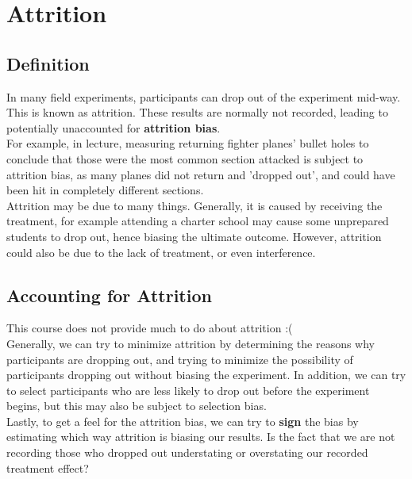 \documentclass{article}
\begin{document}
\section{Attrition}
\subsection{Definition}
In many field experiments, participants can drop out of the experiment mid-way.
This is known as attrition. 
These results are normally not recorded, leading to potentially unaccounted for \textbf{attrition bias}. 
\\
For example, in lecture, measuring returning fighter planes' bullet holes to conclude that those were the most common section attacked is subject to attrition bias, as many planes did not return and 'dropped out', and could have been hit in completely different sections.
\\
Attrition may be due to many things.
Generally, it is caused by receiving the treatment, for example attending a charter school may cause some unprepared students to drop out, hence biasing the ultimate outcome.
However, attrition could also be due to the lack of treatment, or even interference. 

\subsection{Accounting for Attrition}
This course does not provide much to do about attrition :(
\\
Generally, we can try to minimize attrition by determining the reasons why participants are dropping out, and trying to minimize the possibility of participants dropping out without biasing the experiment. 
In addition, we can try to select participants who are less likely to drop out before the experiment begins, but this may also be subject to selection bias. 
\\
Lastly, to get a feel for the attrition bias, we can try to \textbf{sign} the bias by estimating which way  attrition is biasing our results.
Is the fact that we are not recording those who dropped out understating or overstating our recorded treatment effect? 
\end{document}
